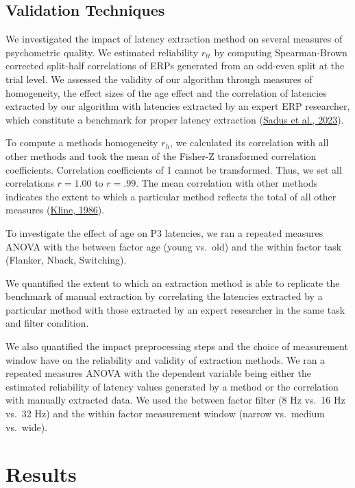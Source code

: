 \documentclass[
  man]{apa7}
\begin{document}
\hypertarget{validation-techniques}{%
\subsection{Validation Techniques}\label{validation-techniques}}

We investigated the impact of latency extraction method on several measures of psychometric quality. We estimated reliability \(r_{tt}\) by computing Spearman-Brown corrected split-half correlations of ERPs generated from an odd-even split at the trial level. We assessed the validity of our algorithm through measures of homogeneity, the effect sizes of the age effect and the correlation of latencies extracted by our algorithm with latencies extracted by an expert ERP researcher, which constitute a benchmark for proper latency extraction (\protect\hyperlink{ref-sadus2023multiverse}{Sadus et al., 2023}).

To compute a methods homogeneity \(r_h\), we calculated its correlation with all other methods and took the mean of the Fisher-Z transformed correlation coefficients. Correlation coefficients of 1 cannot be transformed. Thus, we set all correlations \(r = 1.00\) to \(r = .99\). The mean correlation with other methods indicates the extent to which a particular method reflects the total of all other measures (\protect\hyperlink{ref-kline1986handbook}{Kline, 1986}).

To investigate the effect of age on P3 latencies, we ran a repeated measures ANOVA with the between factor age (young vs.~old) and the within factor task (Flanker, Nback, Switching).

We quantified the extent to which an extraction method is able to replicate the benchmark of manual extraction by correlating the latencies extracted by a particular method with those extracted by an expert researcher in the same task and filter condition.

We also quantified the impact preprocessing steps and the choice of measurement window have on the reliability and validity of extraction methods. We ran a repeated measures ANOVA with the dependent variable being either the estimated reliability of latency values generated by a method or the correlation with manually extracted data. We used the between factor filter (8 Hz vs.~16 Hz vs.~32 Hz) and the within factor measurement window (narrow vs.~medium vs.~wide).

\hypertarget{results}{%
\section{Results}\label{results}}
\end{document}
